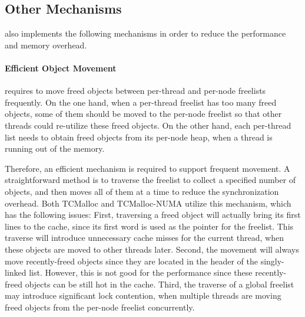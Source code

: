 \subsection{Other Mechanisms}
\label{sec:others}

\NM{} also implements the following mechanisms in order to reduce the performance and memory overhead. 

\paragraph{Efficient Object Movement} 
\NM{} requires to move freed objects between per-thread and per-node freelists frequently. On the one hand, when a per-thread freelist has too many freed objects, some of them should be moved to the per-node freelist so that other threads could re-utilize these freed objects. On the other hand, each per-thread list needs to obtain freed objects from its per-node heap, when a thread is running out of the memory. 

Therefore, an efficient mechanism is required to support frequent movement. A straightforward method is to traverse the freelist to collect a specified number of objects, and then moves all of them at a time to reduce the synchronization overhead. Both TCMalloc and TCMalloc-NUMA utilize this mechanism, which has the following issues: First, traversing a freed object will actually bring its first lines to the cache, since its first word is used as the pointer for the freelist. This traverse will introduce unnecessary cache misses for the current thread, when these objects are moved to other threads later. 
Second, the movement will always move recently-freed objects since they are located in the header of the singly-linked list. However, this is not good for the performance since these recently-freed objects can be still hot in the cache. 
Third, the traverse of a global freelist may introduce significant lock contention, when multiple threads are moving freed objects from the per-node freelist concurrently. 
 
